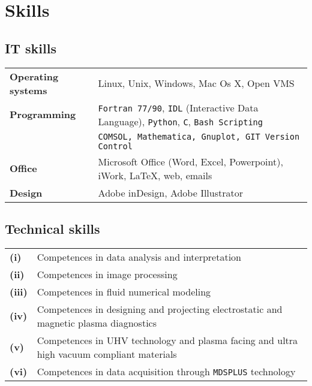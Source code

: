 \section{Skills}

\subsection{IT skills}
\begin{tabular}{ll}
\textbf{Operating systems} & Linux, Unix, Windows, Mac Os X, Open VMS
\\
\textbf{Programming} & \texttt{Fortran 77/90}, \texttt{IDL} (Interactive Data Language),
\texttt{Python}, \texttt{C}, \texttt{Bash Scripting} \\
 & \texttt{COMSOL, Mathematica, Gnuplot, GIT Version Control}  \\
\textbf{Office} & Microsoft Office (Word, Excel, Powerpoint), iWork,
\LaTeX, web, emails \\
\textbf{Design} & Adobe inDesign, Adobe Illustrator
\end{tabular}

\subsection{Technical skills}
\begin{tabular}{>{\bfseries}l p{15cm}}
(i)   & Competences in data analysis and interpretation \\
(ii)  & Competences in image processing \\
(iii) & Competences in fluid numerical modeling \\
(iv) & Competences in designing and projecting electrostatic and
magnetic plasma diagnostics \\
(v)  & Competences in UHV technology and plasma facing and ultra high
  vacuum compliant materials \\
(vi) & Competences in data acquisition through \texttt{MDSPLUS} technology
\end{tabular}
